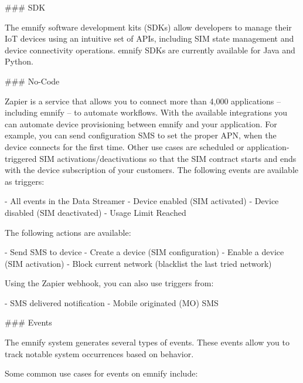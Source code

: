 \documentclass[11pt, oneside]{article}   	%
\newcommand{\addspace}{\vspace{2mm}}
\begin{document}
\begin{markdown}
### SDK

The emnify software development kits (SDKs) allow developers to manage their IoT devices using an intuitive set of APIs, including SIM state management and device connectivity operations.
emnify SDKs are currently available for Java and Python.

### No-Code

Zapier is a service that allows you to connect more than 4,000 applications -- including emnify -- to automate workflows.
With the available integrations you can automate device provisioning between emnify and your application.
For example, you can send configuration SMS to set the proper APN, when the device connects for the first time.
Other use cases are scheduled or application-triggered SIM activations/deactivations so that the SIM contract starts and ends with the device subscription of your customers.
The following events are available as triggers:
\end{markdown}
\addspace
\begin{markdown}
- All events in the Data Streamer
- Device enabled (SIM activated)
- Device disabled (SIM deactivated)
- Usage Limit Reached
\end{markdown}
\addspace
\begin{markdown}

The following actions are available:

\end{markdown}
\addspace
\begin{markdown}
- Send SMS to device
- Create a device (SIM configuration)
- Enable a device (SIM activation)
- Block current network (blacklist the last tried network)
\end{markdown}
\addspace
\begin{markdown}

Using the Zapier webhook, you can also use triggers from:

\end{markdown}
\addspace
\begin{markdown}
- SMS delivered notification
- Mobile originated (MO) SMS
\end{markdown}
\addspace
\begin{markdown}

### Events

The emnify system generates several types of events.
These events allow you to track notable system occurrences based on behavior.

Some common use cases for events on emnify include:

\end{markdown}
\end{document}
